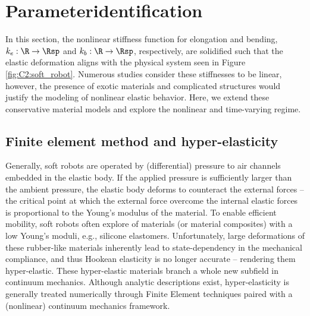 \section{\editl Parameter\editr identification}
\label{sec: chap2 section header}
\noindent In this section, the nonlinear stiffness function for elongation and bending, $k_e: \R \to \Rsp$ and $k_b: \R \to \Rsp$, respectively, are solidified such that the elastic deformation aligns with the physical system seen in Figure \ref{fig:C2:soft_robot}. Numerous studies consider these stiffnesses to be linear, however, the presence of exotic materials and complicated structures would justify the modeling of nonlinear elastic behavior. Here, we extend these conservative material models and explore the nonlinear and time-varying regime.

\subsection{Finite element method and hyper-elasticity}
Generally, soft robots are operated by (differential) pressure to air channels embedded in the elastic body. If the applied pressure is sufficiently larger than the ambient pressure, the elastic body deforms to counteract the external forces -- the critical point at which the external force overcome the internal elastic forces is proportional to the Young's modulus of the material. To enable efficient mobility, soft robots often explore of materials (or material composites) with a low Young's moduli, e.g., silicone elastomers. Unfortunately, large deformations of these rubber-like materials inherently lead to state-dependency in the mechanical compliance, and thus Hookean elasticity is no longer accurate -- rendering them hyper-elastic. These hyper-elastic materials branch a whole new subfield in continuum mechanics. Although analytic descriptions exist, hyper-elasticity is generally treated numerically through Finite Element techniques \cite{Duriez2013,Largilliere2015,Coevoet2017} paired with a (nonlinear) continuum mechanics framework.


